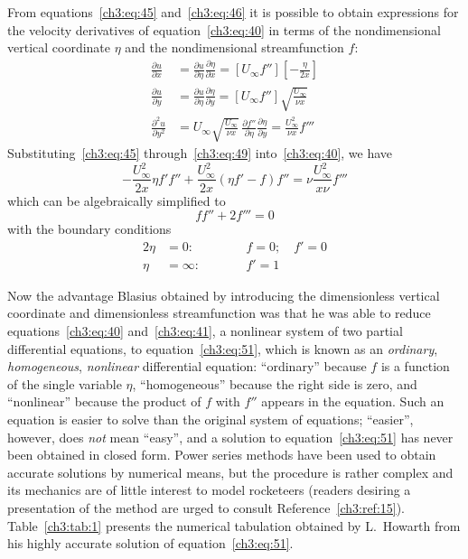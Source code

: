 From equations~\eqref{ch3:eq:45} and~\eqref{ch3:eq:46} it is possible to
obtain expressions for the velocity derivatives of equation~\eqref{ch3:eq:40}
in terms of the nondimensional vertical coordinate $\eta$ and the
nondimensional streamfunction $f$:
\begin{align}
\frac{\partial u}{\partial x}
  &= \frac{\partial u}{\partial\eta}\frac{\partial\eta}{\partial x}
  = \left[U_\infty f''\right]\left[-\frac{\eta}{2x}\right] \label{ch3:eq:47}\\
\frac{\partial u}{\partial y}
  &= \frac{\partial u}{\partial\eta}\frac{\partial\eta}{\partial y}
  = \left[U_\infty f''\right]\sqrt{\frac{U_\infty}{\nu x}} \label{ch3:eq:48}\\
\frac{\partial^2 u}{\partial y^2}
  &= U_\infty\sqrt{\frac{U_\infty}{\nu x}}\,
  \frac{\partial f''}{\partial\eta}\frac{\partial\eta}{\partial y}
  = \frac{U_\infty^2}{\nu x}f''' \label{ch3:eq:49}
\end{align}
Substituting~\eqref{ch3:eq:45} through~\eqref{ch3:eq:49}
into~\eqref{ch3:eq:40}, we have
\begin{equation}\label{ch3:eq:50}
-\frac{U_\infty^2}{2x}\eta f'f'' + \frac{U_\infty^2}{2x}(\eta f' - f)f''
  = \nu\frac{U_\infty^2}{x\nu}f'''
\end{equation}
which can be algebraically simplified to
\begin{equation}\label{ch3:eq:51}
ff'' + 2f''' = 0
\end{equation}
with the boundary conditions
\begin{alignat}{2}
\eta &= 0\colon &\qquad& f = 0;\quad f' = 0 \label{ch3:eq:52}\\
\eta &= \infty\colon && f' = 1 \label{ch3:eq:53}
\end{alignat}

Now the advantage Blasius obtained by introducing the dimensionless vertical
coordinate and dimensionless streamfunction was that he was able to reduce
equations~\eqref{ch3:eq:40} and~\eqref{ch3:eq:41}, a nonlinear system of two
partial differential equations, to equation~\eqref{ch3:eq:51}, which is known
as an \emph{ordinary}, \emph{homogeneous}, \emph{nonlinear} differential
equation: ``ordinary'' because $f$ is a function of the single variable
$\eta$, ``homogeneous'' because the right side is zero, and ``nonlinear''
because the product of $f$ with $f''$ appears in the equation. Such an
equation is easier to solve than the original system of equations;
``easier'', however, does \emph{not} mean ``easy'', and a solution to
equation~\eqref{ch3:eq:51} has never been obtained in closed form. Power
series methods have been used to obtain accurate solutions by numerical means,
but the procedure is rather complex and its mechanics are of little interest
to model rocketeers (readers desiring a presentation of the method are urged
to consult Reference~\ref{ch3:ref:15}). Table~\ref{ch3:tab:1} presents the
numerical tabulation obtained by L.~Howarth from his highly accurate solution
of equation~\eqref{ch3:eq:51}.

